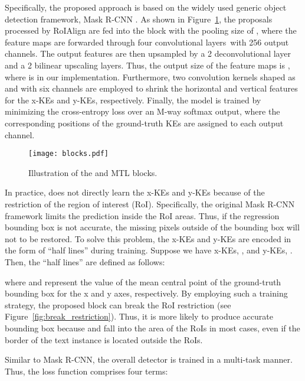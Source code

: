 \def\x{\xspace}

Specifically, the proposed approach is based on the widely used generic object detection framework, Mask R-CNN \cite{he2017mask}. As shown in Figure~\ref{fig:mtl_blocks}, the proposals processed by RoIAlign are fed into the \Ours block with the pooling size of , where the feature maps are forwarded through four convolutional layers\ with 256 output channels. The output features are then upsampled by a 2\x deconvolutional layer and a 2\x bilinear upscaling layers. Thus, the output size of the feature maps  is , where  is  in our implementation. 
Furthermore, two convolution kernels shaped as  and  with six channels are employed to shrink the horizontal and vertical features for the x-KEs and y-KEs, respectively. Finally, the \Ours model is trained by minimizing the cross-entropy loss  over an M-way softmax output, where the corresponding positions of the ground-truth KEs are assigned to each output channel. 


\begin{figure}[b!]
  \centering
  \texttt{[image: blocks.pdf]}
  \caption{Illustration of the \Ours and MTL blocks.}
  \label{fig:mtl_blocks}
\end{figure}


In practice, \Ours does not directly learn the x-KEs and y-KEs because of the restriction of the region of interest (RoI). Specifically, the original Mask R-CNN framework limits the prediction inside the RoI areas. Thus, if the regression bounding box is not accurate, the missing pixels outside of the bounding box will not to be restored. To solve this problem, the x-KEs and y-KEs are encoded in the form of ``half lines'' during training. Suppose we have x-KEs, , and y-KEs, . Then, the ``half lines'' are defined as follows:

\noindent where  and  represent the value of the mean central point of the ground-truth bounding box for the x and y axes, respectively. By employing such a training strategy, the proposed \Ours block can break the RoI restriction (see Figure~\ref{fig:break_restriction}). Thus, it is more likely to produce accurate bounding box because  and  fall into the area of the RoIs in most cases, even if the border of the text instance is located outside the RoIs.

Similar to Mask R-CNN, the overall detector is trained in a multi-task manner.  Thus, the loss function comprises four terms: 

